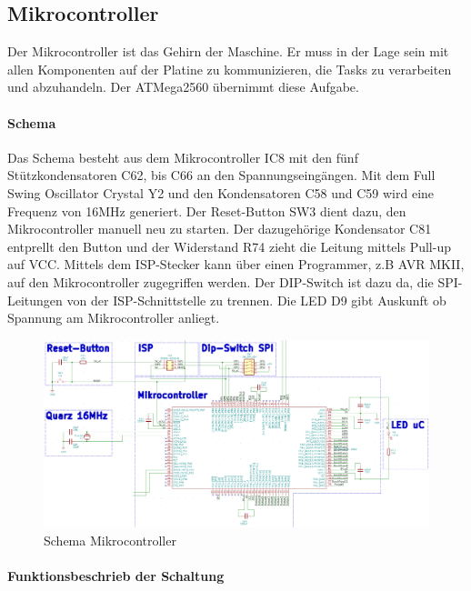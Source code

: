 \subsection{Mikrocontroller}
\label{subsec:Mikrocontroller}

Der Mikrocontroller ist das Gehirn der Maschine. Er muss in der Lage sein mit allen Komponenten auf der Platine zu kommunizieren, die Tasks zu verarbeiten und abzuhandeln. Der ATMega2560 übernimmt diese Aufgabe.

\paragraph{Schema}\mbox{}

Das Schema besteht aus dem Mikrocontroller IC8 mit den fünf Stützkondensatoren C62, bis C66 an den Spannungseingängen. Mit dem Full Swing Oscillator Crystal Y2 und den Kondensatoren C58 und C59 wird eine Frequenz von 16MHz generiert. Der Reset-Button SW3 dient dazu, den Mikrocontroller manuell neu zu starten. Der dazugehörige Kondensator C81 entprellt den Button und der Widerstand R74 zieht die Leitung mittels Pull-up auf VCC. Mittels dem ISP-Stecker kann über einen Programmer, z.B AVR MKII, auf den Mikrocontroller zugegriffen werden. Der DIP-Switch ist dazu da, die SPI-Leitungen von der ISP-Schnittstelle zu trennen. Die LED D9 gibt Auskunft ob Spannung am Mikrocontroller anliegt.

\begin{figure}[H]
\center
\includegraphics[width = \textwidth]{graphics/Schema_uC}
\caption{Schema Mikrocontroller}
\label{fig:Schema_uC}
\end{figure}

\paragraph{Funktionsbeschrieb der Schaltung}\mbox{}

